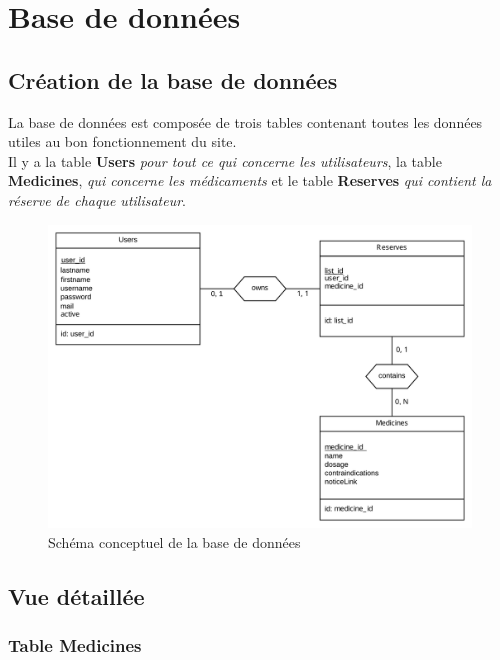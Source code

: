 \section{Base de données}
\label{sec:BD}


\subsection{Création de la base de données}
\label{sec:creation-db}

La base de données est composée de trois tables contenant toutes les données utiles au bon fonctionnement du site.\\
Il y a la table \textbf{Users} \textit{pour tout ce qui concerne les utilisateurs}, la table \textbf{Medicines}, \textit{qui concerne les médicaments} et le table \textbf{Reserves} \textit{qui contient la réserve de chaque utilisateur}.

\begin{figure}[h]
  \centering
  \includegraphics[scale=0.4]
  {textures/images/db/DB.pdf}
  \caption{Schéma conceptuel de la base de données}
  \label{fig:db}
\end{figure}

\newpage

\subsection{Vue détaillée}
\label{sec:vue-details}


\subsubsection{Table Medicines}
\label{sec:table-med}

